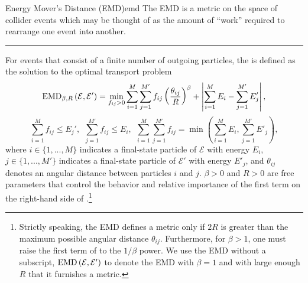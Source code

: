 \begin{definitionbox}{Energy Mover's Distance (EMD)}{emd}
    The EMD is a metric on the space of collider events which may be thought of as the amount of ``work'' required to rearrange one event into another.

    \vspace{7pt}
    \hrule
    \vspace{7pt}

    For events that consist of a finite number of outgoing particles, the  is defined as the solution to the optimal transport problem
    \begin{equation}
        \label{eq:EMD_def_1}
        {\rm EMD}_{\beta, R}\left(\mathcal{E}, \mathcal{E}'\right)
        =
        \min_{f_{ij} > 0} \sum_{i = 1}^M \sum_{j = 1}^{M'} f_{ij} \left(\frac{\theta_{ij}}{R}\right)^\beta
        +
        \left| \sum_{i = 1}^M E_i -  \sum_{j = 1}^{M'} E'_j\right|,
    \end{equation}
    \begin{equation}
        \sum_{i = 1}^M f_{ij} \leq E_j',
        ~~
        \sum_{j = 1}^{M'} f_{ij} \leq E_i,
        ~~
        \sum_{i = 1}^M \sum_{j = 1}^{M'} f_{ij}
        = \min\left(\sum_{i = 1}^M E_i, \sum_{j = 1}^{M'} E'_j\right)
        \label{eq:EMD_def_2}
        ,
    \end{equation}
    where \(i \in \{1, ..., M\}\) indicates a final-state particle of \(\mathcal{E}\) with energy \(E_i\), \(j \in \{1, ..., M'\}\) indicates a final-state particle of \(\mathcal{E}'\) with energy \(E'_j\), and \(\theta_{ij}\) denotes an angular distance between particles \(i\) and \(j\).
    \(\beta > 0\) and \(R > 0\) are free parameters that control the behavior and relative importance of the first term on the right-hand side of .\footnote{
    Strictly speaking, the EMD defines a metric only if \(2 R\) is greater than the maximum possible angular distance \(\theta_{ij}\).
    Furthermore, for \(\beta > 1\), one must raise the first term of  to the \(1/\beta\) power.
    We use the EMD without a subscript, \(
    {\rm EMD}\left(\mathcal{E}, \mathcal{E}'\right)
    \) to denote the EMD with \(\beta = 1\) and with large enough \(R\) that it furnishes a metric.
    }
\end{definitionbox}



